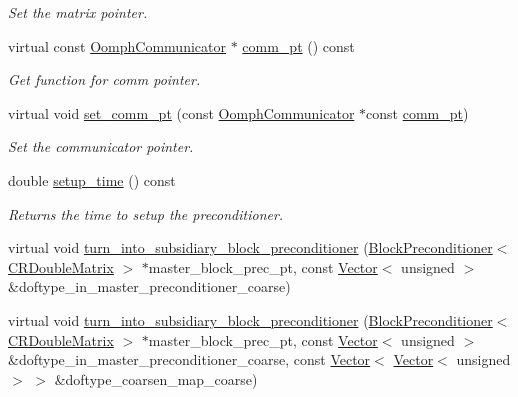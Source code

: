 \begin{DoxyCompactItemize}
\begin{DoxyCompactList}\small\item\em Set the matrix pointer. \end{DoxyCompactList}\item 
virtual const \hyperlink{classoomph_1_1OomphCommunicator}{Oomph\+Communicator} $\ast$ \hyperlink{classoomph_1_1Preconditioner_ada7219933e05d94f39a46a8ddb4c749a}{comm\+\_\+pt} () const
\begin{DoxyCompactList}\small\item\em Get function for comm pointer. \end{DoxyCompactList}\item 
virtual void \hyperlink{classoomph_1_1Preconditioner_a306f5a52f493816fcfda2dc9b2ee1dbf}{set\+\_\+comm\+\_\+pt} (const \hyperlink{classoomph_1_1OomphCommunicator}{Oomph\+Communicator} $\ast$const \hyperlink{classoomph_1_1Preconditioner_ada7219933e05d94f39a46a8ddb4c749a}{comm\+\_\+pt})
\begin{DoxyCompactList}\small\item\em Set the communicator pointer. \end{DoxyCompactList}\item 
double \hyperlink{classoomph_1_1Preconditioner_a9202e15534f063a8e21a8a60623eac9f}{setup\+\_\+time} () const
\begin{DoxyCompactList}\small\item\em Returns the time to setup the preconditioner. \end{DoxyCompactList}\item 
virtual void \hyperlink{classoomph_1_1Preconditioner_a1183f65956ef8a5b332a1246f418e907}{turn\+\_\+into\+\_\+subsidiary\+\_\+block\+\_\+preconditioner} (\hyperlink{classoomph_1_1BlockPreconditioner}{Block\+Preconditioner}$<$ \hyperlink{classoomph_1_1CRDoubleMatrix}{C\+R\+Double\+Matrix} $>$ $\ast$master\+\_\+block\+\_\+prec\+\_\+pt, const \hyperlink{classoomph_1_1Vector}{Vector}$<$ unsigned $>$ \&doftype\+\_\+in\+\_\+master\+\_\+preconditioner\+\_\+coarse)
\item 
virtual void \hyperlink{classoomph_1_1Preconditioner_a61a462f4266c22050b4ab9ab441c77a6}{turn\+\_\+into\+\_\+subsidiary\+\_\+block\+\_\+preconditioner} (\hyperlink{classoomph_1_1BlockPreconditioner}{Block\+Preconditioner}$<$ \hyperlink{classoomph_1_1CRDoubleMatrix}{C\+R\+Double\+Matrix} $>$ $\ast$master\+\_\+block\+\_\+prec\+\_\+pt, const \hyperlink{classoomph_1_1Vector}{Vector}$<$ unsigned $>$ \&doftype\+\_\+in\+\_\+master\+\_\+preconditioner\+\_\+coarse, const \hyperlink{classoomph_1_1Vector}{Vector}$<$ \hyperlink{classoomph_1_1Vector}{Vector}$<$ unsigned $>$ $>$ \&doftype\+\_\+coarsen\+\_\+map\+\_\+coarse)
\end{DoxyCompactItemize}

